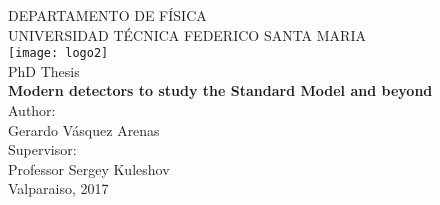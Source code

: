 \begin{titlepage}
	\begin{center}
		\vspace*{1cm}
		\Large
		DEPARTAMENTO DE F\'ISICA\\
		UNIVERSIDAD T\'ECNICA FEDERICO SANTA MARIA\\
		\vspace*{1cm}
		\texttt{[image: logo2]}\\
		\vspace{1.5cm}
		\Large PhD Thesis\\
		\vspace{1cm}
		{\Huge
		{\bf Modern detectors to study the Standard Model and beyond}
		}\\
		\vspace{2.5cm}
		Author:\\
		Gerardo V\'asquez Arenas\\
		\vspace*{0.5cm}
		Supervisor:\\
		Professor Sergey Kuleshov\\
		\vfill
		Valparaiso, 2017
		\end{center}
\end{titlepage}

